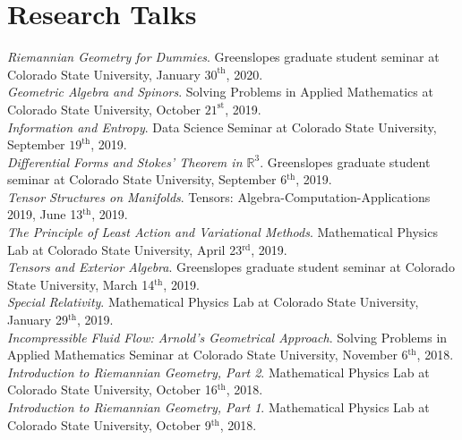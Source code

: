 \documentclass[12pt]{article} %
\begin{document}
\section{Research Talks}
\begin{flushleft}
	\emph{Riemannian Geometry for Dummies}. Greenslopes graduate student seminar at Colorado State University, January $30^\textrm{th}$, 2020.\\
	    \vspace*{5pt}
    \emph{Geometric Algebra and Spinors}. Solving Problems in Applied Mathematics at Colorado State University, October $21^\textrm{st}$, 2019.\\
    \vspace*{5pt}
    \emph{Information and Entropy}. Data Science Seminar at Colorado State University, September $19^{\textrm{th}}$, 2019.
    \\
    \vspace*{5pt}
    \emph{Differential Forms and Stokes' Theorem in $\mathbb{R}^3$}. Greenslopes graduate student seminar at Colorado State University, September 6$^\textrm{th}$, 2019.
    \\
    \vspace*{5pt}
    \emph{Tensor Structures on Manifolds}. Tensors: Algebra-Computation-Applications 2019, June 13$^\textrm{th}$, 2019. \\
    \vspace*{5pt}
    \emph{The Principle of Least Action and Variational Methods}. Mathematical Physics Lab at Colorado State University, April 23$^\textrm{rd}$, 2019. \\
    \vspace*{5pt}
    \emph{Tensors and Exterior Algebra}. Greenslopes graduate student seminar at Colorado State University, March 14$^\textrm{th}$, 2019.\\
    \vspace*{5pt}
    \emph{Special Relativity}. Mathematical Physics Lab at Colorado State University, January 29$^\textrm{th}$, 2019.\\
    \vspace*{5pt}
    \emph{Incompressible Fluid Flow: Arnold's Geometrical Approach}. Solving Problems in Applied Mathematics Seminar at Colorado State University, November 6$^\textrm{th}$, 2018.\\
    \vspace*{5pt}
    \emph{Introduction to Riemannian Geometry, Part 2}. Mathematical Physics Lab at Colorado State University, October 16$^\textrm{th}$, 2018.\\
    \vspace*{5pt}
    \emph{Introduction to Riemannian Geometry, Part 1}. Mathematical Physics Lab at Colorado State University, October 9$^\textrm{th}$, 2018.
\end{flushleft}
\end{document}
